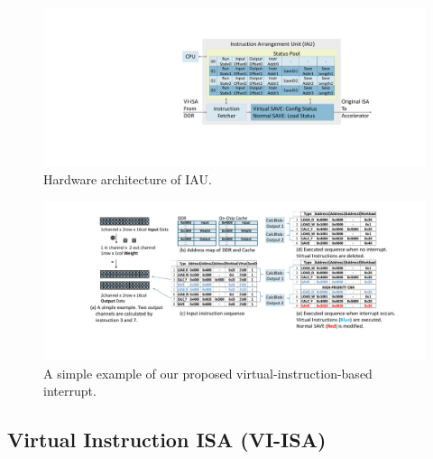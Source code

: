 \begin{figure}[t]
	\centering
    \setlength{\abovecaptionskip}{0cm} 
    \setlength{\belowcaptionskip}{-0.4cm} 
	\includegraphics[width=0.99\linewidth]{fig/iau.pdf}
	\caption{Hardware architecture of IAU. 
	}
	\label{fig:IAU}
\end{figure}
\begin{figure}[t]
	\centering
    \setlength{\abovecaptionskip}{0cm} 
	\includegraphics[width=0.99\linewidth]{fig/interexample.pdf}
	\caption{ A simple example of our proposed virtual-instruction-based interrupt. }
	\label{fig:interexample}
\end{figure}



\subsection{Virtual Instruction ISA (VI-ISA) }
\label{sec:virtualinstr}

